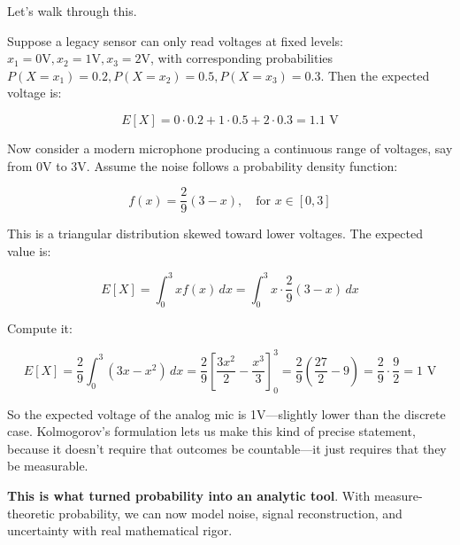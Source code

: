 Let’s walk through this.

Suppose a legacy sensor can only read voltages at fixed levels:  
\( x_1 = 0\text{V}, x_2 = 1\text{V}, x_3 = 2\text{V} \),  
with corresponding probabilities \( P(X = x_1) = 0.2, P(X = x_2) = 0.5, P(X = x_3) = 0.3 \).  
Then the expected voltage is:

\[
E[X] = 0 \cdot 0.2 + 1 \cdot 0.5 + 2 \cdot 0.3 = 1.1 \text{ V}
\]

Now consider a modern microphone producing a continuous range of voltages, say from 0V to 3V. Assume the noise follows a probability density function:

\[
f(x) = \frac{2}{9}(3 - x), \quad \text{for } x \in [0, 3]
\]

This is a triangular distribution skewed toward lower voltages. The expected value is:

\[
E[X] = \int_0^3 x f(x)\,dx = \int_0^3 x \cdot \frac{2}{9}(3 - x)\,dx
\]

Compute it:

\[
E[X] = \frac{2}{9} \int_0^3 (3x - x^2)\,dx = \frac{2}{9} \left[ \frac{3x^2}{2} - \frac{x^3}{3} \right]_0^3 = \frac{2}{9} \left( \frac{27}{2} - 9 \right) = \frac{2}{9} \cdot \frac{9}{2} = 1 \text{ V}
\]

So the expected voltage of the analog mic is 1V—slightly lower than the discrete case. Kolmogorov’s formulation lets us make this kind of precise statement, because it doesn’t require that outcomes be countable—it just requires that they be measurable.

\textbf{This is what turned probability into an analytic tool}. With measure-theoretic probability, we can now model noise, signal reconstruction, and uncertainty with real mathematical rigor.


